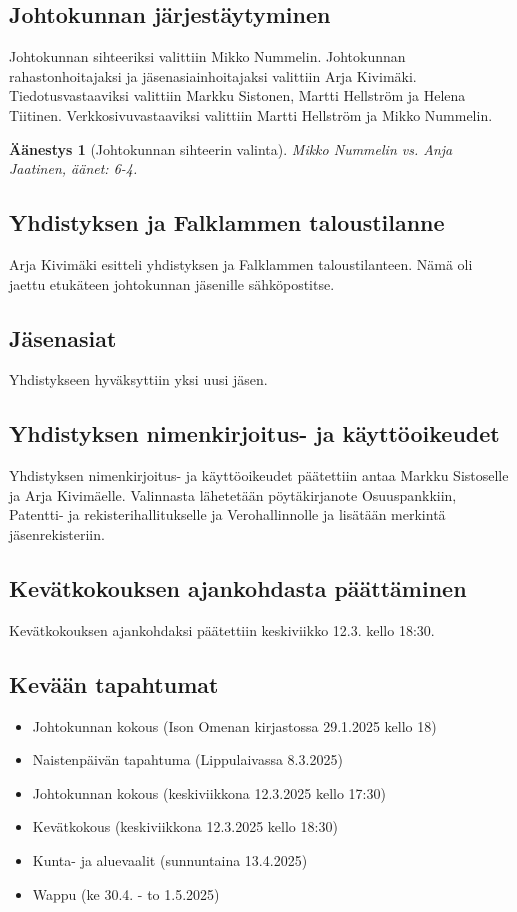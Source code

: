 \documentclass[a4paper,12pt]{article}
\newtheorem{aanestys}{Äänestys}
\begin{document}
\subsection{Johtokunnan järjestäytyminen}
Johtokunnan sihteeriksi valittiin Mikko Nummelin. Johtokunnan rahastonhoitajaksi ja jäsenasiainhoitajaksi valittiin Arja Kivimäki. Tiedotusvastaaviksi valittiin Markku Sistonen, Martti Hellström ja Helena Tiitinen. Verkkosivuvastaaviksi valittiin Martti Hellström ja Mikko Nummelin.
\begin{aanestys}[Johtokunnan sihteerin valinta]
  Mikko Nummelin vs. Anja Jaatinen, äänet: 6-4.
\end{aanestys}
\subsection{Yhdistyksen ja Falklammen taloustilanne}
Arja Kivimäki esitteli yhdistyksen ja Falklammen taloustilanteen. Nämä oli jaettu etukäteen johtokunnan jäsenille sähköpostitse.
\subsection{Jäsenasiat}
Yhdistykseen hyväksyttiin yksi uusi jäsen.
\subsection{Yhdistyksen nimenkirjoitus- ja käyttöoikeudet}
Yhdistyksen nimenkirjoitus- ja käyttöoikeudet päätettiin antaa Markku Sistoselle ja Arja Kivimäelle. Valinnasta lähetetään pöytäkirjanote Osuuspankkiin, Patentti- ja rekisterihallitukselle ja Verohallinnolle ja lisätään merkintä jäsenrekisteriin.
\subsection{Kevätkokouksen ajankohdasta päättäminen}
Kevätkokouksen ajankohdaksi päätettiin keskiviikko 12.3. kello 18:30.
\subsection{Kevään tapahtumat}
\begin{itemize}
\item{Johtokunnan kokous} (Ison Omenan kirjastossa 29.1.2025 kello 18)
\item{Naistenpäivän tapahtuma} (Lippulaivassa 8.3.2025)
\item{Johtokunnan kokous} (keskiviikkona 12.3.2025 kello 17:30)
\item{Kevätkokous} (keskiviikkona 12.3.2025 kello 18:30)
\item{Kunta- ja aluevaalit} (sunnuntaina 13.4.2025)
\item{Wappu} (ke 30.4. - to 1.5.2025)
\end{itemize}
\end{document}
